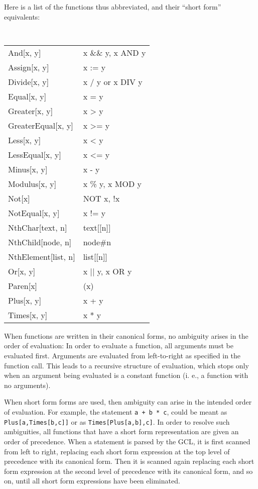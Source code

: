 Here is a list of the functions thus abbreviated, and their ``short form''
equivalents:

\medskip

{\tt
\begin{tabular}{lp{4in}}
And[x, y]		& x \&\& y, x AND y \\
Assign[x, y]		& x := y \\
Divide[x, y]		& x / y or x DIV y \\
Equal[x, y]		& x = y \\
Greater[x, y]		& x > y \\
GreaterEqual[x, y]	& x >= y \\
Less[x, y]		& x < y \\
LessEqual[x, y]		& x <= y \\
Minus[x, y]		& x - y \\
Modulus[x, y]		& x \% y, x MOD y \\
Not[x]			& NOT x, !x \\
NotEqual[x, y]		& x != y \\
NthChar[text, n]	& text[[n]] \\
NthChild[node, n]	& node\#n \\ 
NthElement[list, n]	& list[[n]] \\
Or[x, y]		& x || y, x OR y \\
Paren[x]		& (x) \\ 
Plus[x, y]		& x + y \\
Times[x, y]		& x * y \\
\end{tabular}
}

When functions are written in their canonical forms, no ambiguity
arises in the order of evaluation: In order to evaluate a function,
all arguments must be evaluated first.  Arguments are evaluated from
left-to-right as specified in the function call.
This leads to a recursive structure of evaluation,
which stops only when an argument being evaluated is a constant
function (i. e., a function with no arguments).

When short form forms are used, then ambiguity can arise in the
intended order of evaluation.  For example, the statement \verb&a + b * c&,
could be meant as \verb+Plus[a,Times[b,c]]+ or as
\verb+Times[Plus[a,b],c]+.  In order to resolve such ambiguities, all
functions that have a short form representation are given an order of
precedence.  When a statement is parsed by the GCL, it is first
scanned from left to right, replacing each short form expression at the
top level of precedence with its canonical form.  Then it is scanned
again replacing each short form expression at the second level of
precedence with its canonical form, and so on, until all short form
expressions have been eliminated.  

